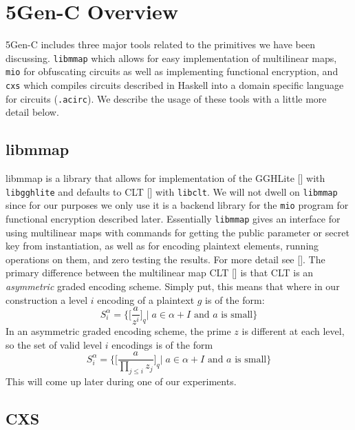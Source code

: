 \documentclass[12pt,twoside]{reedthesis}
\begin{document}
      
    \section{5Gen-C Overview}
    5Gen-C includes three major tools related to the primitives we have been discussing. \texttt{libmmap} which allows for easy implementation of multilinear maps, \texttt{mio} for obfuscating circuits as well as implementing functional encryption, and \texttt{cxs} which compiles circuits described in Haskell into a domain specific language for circuits (\texttt{.acirc}). We describe the usage of these tools with a little more detail below.
    
    \subsection{libmmap}
    libmmap is a library that allows for implementation of the GGHLite [\cite{GGHLite}] with \texttt{libgghlite} and defaults to CLT [\cite{CLT13}] with \texttt{libclt}. We will not dwell on \texttt{libmmap} since for our purposes we only use it is a backend library for the \texttt{mio} program for functional encryption described later. Essentially \texttt{libmmap} gives an interface for using multilinear maps with commands for getting the public parameter or secret key from instantiation, as well as for encoding plaintext elements, running operations on them, and zero testing the results. For more detail see [\cite{5genc}]. The primary difference between the multilinear map CLT [\cite{CLT13}] is that CLT is an \textit{asymmetric} graded encoding scheme. Simply put, this means that where in our construction a level $i$ encoding of a plaintext $g$ is of the form:
    $$S_i^\alpha =\bigg\{\bigg[\frac{a}{z^i} \bigg]_q \bigg| \; a \in \alpha + I \text{ and $a$ is small}\bigg\} $$
    In an asymmetric graded encoding scheme, the prime $z$ is different at each level, so the set of valid level $i$ encodings is of the form
    $$S_i^\alpha =\bigg\{\bigg[\frac{a}{\prod_{j\leq i} z_j} \bigg]_q \bigg| \; a \in \alpha + I \text{ and $a$ is small}\bigg\} $$
      This will come up later during one of our experiments. 
   \subsection{CXS}
   
\end{document}

